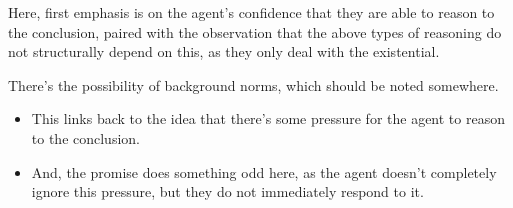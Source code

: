 \documentclass[10pt]{article}
\begin{document}
\begin{note}
  Here, first emphasis is on the agent's confidence that they are able to reason to the conclusion, paired with the observation that the above types of reasoning do not structurally depend on this, as they only deal with the existential.
\end{note}

\begin{note}
  There's the possibility of background norms, which should be noted somewhere.
  \begin{itemize}
  \item This links back to the idea that there's some pressure for the agent to reason to the conclusion.
  \item And, the promise does something odd here, as the agent doesn't completely ignore this pressure, but they do not immediately respond to it.
  \end{itemize}
\end{note}
\end{document}
